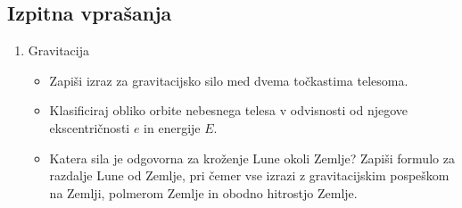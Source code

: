 \subsection*{Izpitna vprašanja}
\begin{enumerate}
    \item Gravitacija
    \begin{itemize}
        \item Zapiši izraz za gravitacijsko silo med dvema točkastima telesoma.
        \item Klasificiraj obliko orbite nebesnega telesa v odvisnosti od njegove ekscentričnosti \(e\) in energije \(E\). 
        \item Katera sila je odgovorna za kroženje Lune okoli Zemlje? Zapiši formulo za razdalje Lune od Zemlje, pri čemer vse izrazi z gravitacijskim pospeškom na Zemlji, polmerom Zemlje in obodno hitrostjo Zemlje.
    \end{itemize}
\end{enumerate}